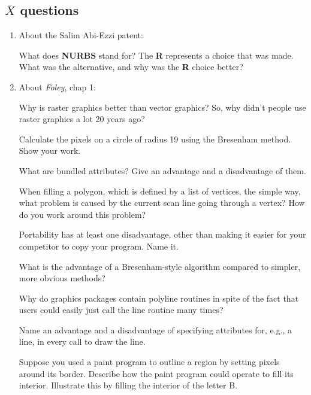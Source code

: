 \documentclass[twoside]{article}
\begin{document}
\setcounter{questionnumber}{\value{enumi}}

\subsection*{$\overline{X}$ questions}

\begin{enumerate}
\setcounter{enumi}{\value{questionnumber}}

\item About the Salim Abi-Ezzi patent:
\begin{enumerate}
 What does {\bf NURBS} stand for?
 The {\bf R} represents a choice that was made.  What was
the alternative, and why was the {\bf R} choice better?
\end{enumerate}

\item About {\em Foley}, chap 1:
\begin{enumerate}
 Why is raster graphics better than vector graphics?
 So, why didn't people use raster graphics a lot 20 years
ago?
\end{enumerate}

 Calculate the pixels on a circle of radius 19 using the
Bresenham method.  Show your work.

 What are bundled attributes?  Give an advantage and a
disadvantage of them.

 When filling a polygon, which is defined by a list of vertices,
the simple way, what problem is caused by the current scan line going
through a vertex?  How do you work around this problem?

 Portability has at least one disadvantage, other than making it
easier for your competitor to copy your program.  Name it.

 What is the advantage of a Bresenham-style algorithm compared to
simpler, more obvious methods?

 Why do graphics packages contain polyline routines in spite of
the fact that users could easily just call the line routine many times?

 Name an advantage and a disadvantage of specifying attributes
for, e.g., a line, in every call to draw the line.

Suppose you used a paint program to outline a region by setting pixels
around its border.
Describe how the paint program could operate to fill its interior.
Illustrate this by filling the interior of the letter {\LARGE B}.


\end{enumerate}
\end{document}

